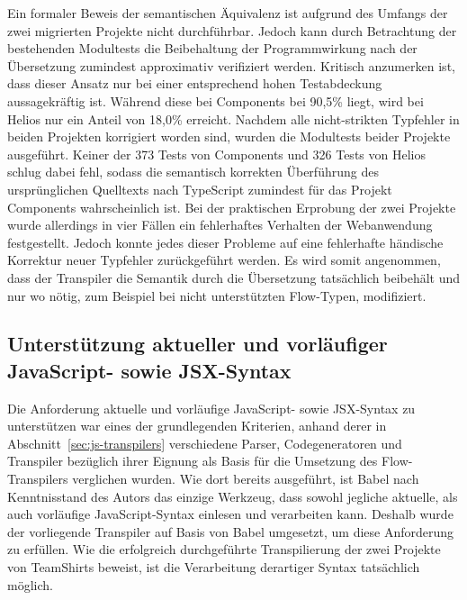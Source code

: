 Ein formaler Beweis der semantischen Äquivalenz ist aufgrund des Umfangs der zwei migrierten Projekte nicht durchführbar. Jedoch kann durch Betrachtung der bestehenden Modultests die Beibehaltung der Programmwirkung nach der Übersetzung zumindest approximativ verifiziert werden. Kritisch anzumerken ist, dass dieser Ansatz nur bei einer entsprechend hohen Testabdeckung aussagekräftig ist. Während diese bei Components bei 90,5\% liegt, wird bei Helios nur ein Anteil von 18,0\% erreicht.
Nachdem alle nicht-strikten Typfehler in beiden Projekten korrigiert worden sind, wurden die Modultests beider Projekte ausgeführt. Keiner der 373 Tests von Components und 326 Tests von Helios schlug dabei fehl, sodass die semantisch korrekten Überführung des ursprünglichen Quelltexts nach TypeScript zumindest für das Projekt Components wahrscheinlich ist. Bei der praktischen Erprobung der zwei Projekte wurde allerdings in vier Fällen ein fehlerhaftes Verhalten der Webanwendung festgestellt. Jedoch konnte jedes dieser Probleme auf eine fehlerhafte händische Korrektur neuer Typfehler zurückgeführt werden. Es wird somit angenommen, dass der Transpiler die Semantik durch die Übersetzung tatsächlich beibehält und nur wo nötig, zum Beispiel bei nicht unterstützten Flow-Typen, modifiziert.

\subsection{Unterstützung aktueller und vorläufiger JavaScript- sowie JSX-Syntax}

Die Anforderung aktuelle und vorläufige JavaScript- sowie JSX-Syntax zu unterstützen war eines der grundlegenden Kriterien, anhand derer in Abschnitt~\ref{sec:js-transpilers} verschiedene Parser, Codegeneratoren und Transpiler bezüglich ihrer Eignung als Basis für die Umsetzung des Flow-Transpilers verglichen wurden. Wie dort bereits ausgeführt, ist Babel nach Kenntnisstand des Autors das einzige Werkzeug, dass sowohl jegliche aktuelle, als auch vorläufige JavaScript-Syntax einlesen und verarbeiten kann. Deshalb wurde der vorliegende Transpiler auf Basis von Babel umgesetzt, um diese Anforderung zu erfüllen. Wie die erfolgreich durchgeführte Transpilierung der zwei Projekte von TeamShirts beweist, ist die Verarbeitung derartiger Syntax tatsächlich möglich.

